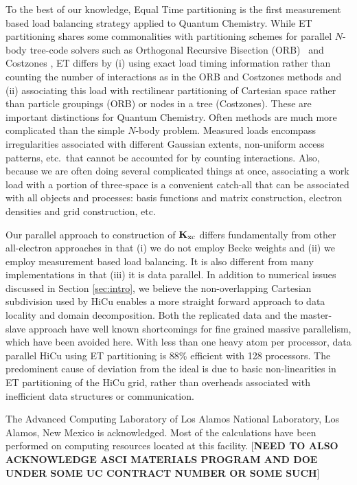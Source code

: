 \commentoutA{\documentclass[prb,aps,twocolumn,twocolumngrid]{revtex4}}
\newcommand{\Kxc}{{\bf K}_{\mathrm{xc}}}
\begin{document}
To the best of our knowledge, Equal Time partitioning is the first measurement based 
load balancing strategy applied to Quantum Chemistry.  While ET partitioning
shares some commonalities with partitioning schemes for parallel $N$-body tree-code solvers
such as Orthogonal Recursive Bisection (ORB)~\cite{warren:92_article} 
and Costzones \cite{Singh93}, ET differs by (i) using exact load timing information rather 
than counting the number of interactions as in the ORB and Costzones methods and (ii) associating
this load with rectilinear partitioning of Cartesian space rather than particle groupings (ORB) 
or nodes in a tree (Costzones).  These are important distinctions for Quantum Chemistry.
Often methods are much more complicated than the simple $N$-body problem.  Measured loads encompass 
irregularities associated with different Gaussian extents, non-uniform access patterns, etc.~that 
cannot be accounted for by counting interactions.  Also, because we are often doing several complicated things 
at once, associating a work load with a portion of three-space is a convenient catch-all
that can be associated with all objects and processes: basis functions and matrix construction,
electron densities and grid construction, etc.  

Our parallel approach to construction of $\Kxc$ differs fundamentally from other all-electron approaches 
in that (i) we do not employ Becke weights and (ii) we employ measurement based load balancing.
It is also different from many implementations in that (iii) it is data parallel. 
In addition to numerical issues discussed in Section \ref{sec:intro}, we believe the non-overlapping
Cartesian subdivision used by HiCu enables a more straight forward approach to data locality 
and domain decomposition.  Both the replicated data and the master-slave approach 
have well known shortcomings for fine grained massive parallelism, which have been avoided
here.  With less than one heavy atom per processor, data parallel HiCu using ET partitioning
is 88\% efficient with 128 processors.  The predominent cause of deviation from the ideal
is due to basic non-linearities in ET partitioning of the HiCu grid, rather than overheads 
associated with inefficient data structures or communication.

\begin{acknowledgments}
The Advanced Computing Laboratory of Los Alamos National Laboratory,
Los Alamos, New Mexico is acknowledged. Most of the calculations have
been performed on computing resources located at this facility.
[{\bf NEED TO ALSO ACKNOWLEDGE ASCI MATERIALS PROGRAM AND DOE UNDER SOME
UC CONTRACT NUMBER OR SOME SUCH}]
\end{acknowledgments}
\end{document}
